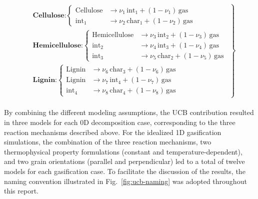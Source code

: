 \documentclass{article}
\begin{document}
\begin{equation}
\label{eq:UCB3}
\left.
\begin{aligned}
&\textbf{Cellulose:}
\left\{
\begin{aligned}
\mathrm{Cellulose} &\rightarrow \nu_1\,\mathrm{int}_1 +(1-\nu_1)\,\mathrm{gas} \\
\mathrm{int}_1 &\rightarrow \nu_2\,\mathrm{char}_1 +(1-\nu_2)\,\mathrm{gas}
\end{aligned}
\right.
\\[10pt]
&\textbf{Hemicellulose:}
\left\{
\begin{aligned}
\mathrm{Hemicellulose} &\rightarrow \nu_3\,\mathrm{int}_2 +(1-\nu_3)\,\mathrm{gas} \\
\mathrm{int}_2 &\rightarrow \nu_4\,\mathrm{int}_3 +(1-\nu_4)\,\mathrm{gas} \\
\mathrm{int}_3 &\rightarrow \nu_5\,\mathrm{char}_2 +(1-\nu_5)\,\mathrm{gas}
\end{aligned}
\right.
\\[10pt]
&\textbf{Lignin:}
\left\{
\begin{aligned}
\mathrm{Lignin} &\rightarrow \nu_6\,\mathrm{char}_3 +(1-\nu_6)\,\mathrm{gas} \\
\mathrm{Lignin} &\rightarrow \nu_7\,\mathrm{int}_4 +(1-\nu_7)\,\mathrm{gas} \\
\mathrm{int}_4 &\rightarrow \nu_8\,\mathrm{char}_4 +(1-\nu_8)\,\mathrm{gas}
\end{aligned}
\right.
\end{aligned}
\right\}
\end{equation}
\\
By combining the different modeling assumptions, the UCB contribution resulted in three models for each 0D decomposition case, corresponding to the three reaction mechanisms described above. For the idealized 1D gasification simulations, the combination of the three reaction mechanisms, two thermophysical property formulations (constant and temperature-dependent), and two grain orientations (parallel and perpendicular) led to a total of twelve models for each gasification case. To facilitate the discussion of the results, the naming convention illustrated in Fig.~\ref{fig:ucb-naming} was adopted throughout this report.
\end{document}
